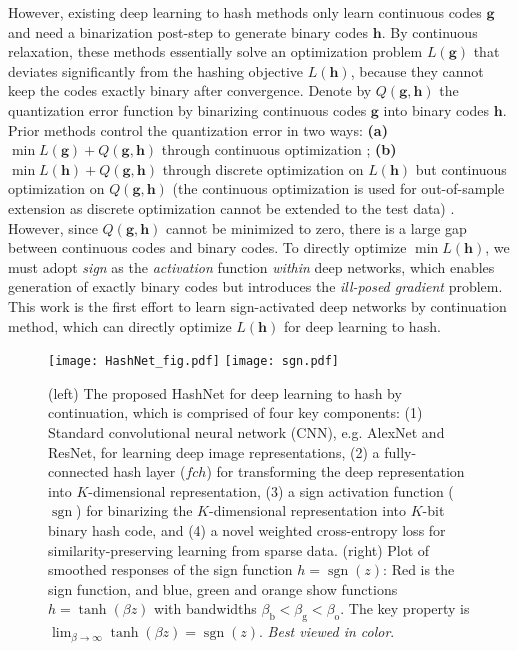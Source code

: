 \documentclass[10pt,twocolumn,letterpaper]{article}
\begin{document}
However, existing deep learning to hash methods only learn continuous codes ${\bm g}$ and need a binarization post-step to generate binary codes ${\bm h}$. By continuous relaxation, these methods essentially solve an optimization problem $ L({\bm g})$ that deviates significantly from the hashing objective $ L({\bm h})$, because they cannot keep the codes exactly binary after convergence. Denote by $Q({\bm g}, {\bm h})$ the quantization error function by binarizing continuous codes ${\bm g}$ into binary codes ${\bm h}$. Prior methods control the quantization error in two ways: \textbf{(a)} $\min L({\bm g}) + Q({\bm g}, {\bm h})$ through continuous optimization \cite{cite:AAAI16DHN,cite:IJCAI16DPSH}; \textbf{(b)} $\min L({\bm h}) + Q({\bm g}, {\bm h})$ through discrete optimization on $L({\bm h})$ but continuous optimization on $Q({\bm g}, {\bm h})$ (the continuous optimization is used for out-of-sample extension as discrete optimization cannot be extended to the test data) \cite{cite:CVPR2016DSH}. However, since $Q({\bm g}, {\bm h})$ cannot be minimized to zero, there is a large gap between continuous codes and binary codes. To directly optimize $\min L({\bm h})$, we must adopt \emph{sign} as the \emph{activation} function \emph{within} deep networks, which enables generation of exactly binary codes but introduces the \emph{ill-posed gradient} problem. This work is the first effort to learn sign-activated deep networks by continuation method, which can directly optimize $L({\bm h})$ for deep learning to hash.

\begin{figure*}[tbp]
  \centering
  \texttt{[image: HashNet\_fig.pdf]}
  \texttt{[image: sgn.pdf]}
  \caption{(left) The proposed HashNet for deep learning to hash by continuation, which is comprised of four key components: (1) Standard convolutional neural network (CNN), e.g. AlexNet and ResNet, for learning deep image representations, (2) a fully-connected hash layer ($fch$) for transforming the deep representation into $K$-dimensional representation, (3) a sign activation function ($\operatorname{sgn}$) for binarizing the $K$-dimensional representation into $K$-bit binary hash code, and (4) a novel weighted cross-entropy loss for similarity-preserving learning from sparse data. (right) Plot of smoothed responses of the sign function $h = \operatorname{sgn} \left( z \right)$: Red is the sign function, and blue, green and orange show functions $h = \operatorname{tanh} \left( \beta z \right)$ with bandwidths $\beta_{\text{b}} < \beta_{\text{g}} < \beta_{\text{o}}$. The key property is $\mathop {\lim }\nolimits_{\beta  \to \infty } \tanh \left( {\beta z} \right) = \operatorname{sgn} \left( z \right)$. \textit{Best viewed in color}.}
  \label{fig:HashNet}
  \vspace{-10pt}
\end{figure*}
\end{document}
